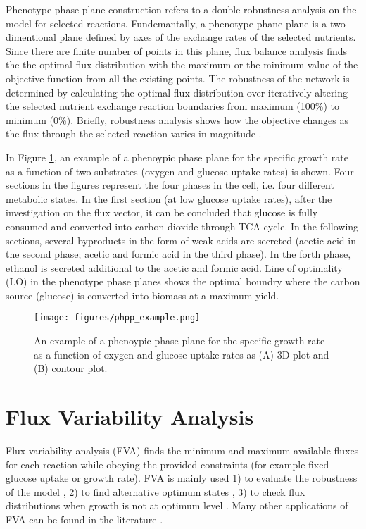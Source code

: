 Phenotype phase plane construction refers to a double robustness analysis on the model for selected reactions. Fundemantally, a phenotype phane plane is a two-dimentional plane defined by axes of the exchange rates of the selected nutrients. Since there are finite number of points in this plane, flux balance analysis finds the the optimal flux distribution with the maximum or the minimum value of the objective function from all the existing points. The robustness of the network is determined by calculating the optimal flux distribution over iteratively altering the selected nutrient exchange reaction boundaries from maximum (100\%) to minimum (0\%). Briefly, robustness analysis shows how the objective changes as the flux through the selected reaction varies in magnitude \cite{edwards2002characterizing}.


In Figure \ref{fig:phpp_example}, an example of a phenoypic phase plane for the specific growth rate as a function of two substrates (oxygen and glucose uptake rates) is shown. Four sections in the figures represent the four phases in the cell, i.e. four different metabolic states. In the first section (at low glucose uptake rates), after the investigation on the flux vector, it can be concluded that glucose is fully consumed and converted into carbon dioxide through TCA cycle. In the following sections, several byproducts in the form of weak acids are secreted (acetic acid in the second phase; acetic and formic acid in the third phase). In the forth phase, ethanol is secreted additional to the acetic and formic acid. Line of optimality (LO) in the phenotype phase planes shows the optimal boundry where the carbon source (glucose) is converted into biomass at a maximum yield.

\begin{figure}[H]
\begin{center}
\texttt{[image: figures/phpp\_example.png]}
\caption[An example of a phenoypic phase plane for the specific growth rate as a function of oxygen and glucose uptake rates as (A) 3D plot and (B) contour plot]{An example of a phenoypic phase plane for the specific growth rate as a function of oxygen and glucose uptake rates as (A) 3D plot and (B) contour plot.}
\label{fig:phpp_example}
\end{center}
\end{figure}


\section{Flux Variability Analysis}
Flux variability analysis (FVA) finds the minimum and maximum available fluxes for each reaction while obeying the provided constraints (for example fixed glucose uptake or growth rate). FVA is mainly used  1) to evaluate the robustness of the model \cite{thiele2010functional}, 2) to find alternative optimum states \cite{mahadevan2003effects}, 3) to check flux distributions when growth is not at optimum level \cite{reed2004genome}. Many other applications of FVA can be found in the literature \cite{gudmundsson2010computationally}.

